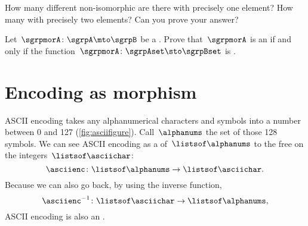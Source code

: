 
\begin{gradedexercise}
    \label{ex:non-isomorphic}
    How many different non-isomorphic  are there with precisely one element?
    How many with precisely two elements?
    Can you prove your answer?
\end{gradedexercise}

\begin{gradedexercise}
    \label{ex:CharacterizeSemigroupIsos}
    \label{ex:semi-morph}
    Let~$\sgrpmorA\colon \sgrpA \mto \sgrpB$ be a .
    Prove that~$\sgrpmorA$ is an  if and only if the function~$\sgrpmorA \colon \sgrpAset \sto \sgrpBset$ is .
\end{gradedexercise}

\section{Encoding as morphism }

\begin{example}
    ASCII encoding takes any alphanumerical characters and symbols into a number between 0 and 127 (\cref{fig:asciifigure}).
    Call~$\alphanums$ the set of those 128 symbols.
    We can see ASCII encoding as a  of~$\listsof\alphanums$ to the free  on the integers~$\listsof\asciichar$:
    \begin{equation}
        \label{eq:ASCII-semi}
        \asciienc\colon \listsof\alphanums \to \listsof\asciichar.
    \end{equation}
    Because we can also go back, by using the inverse function,
    \begin{equation}
        \label{eq:ASCII-semi-inv}
        \asciienc^{-1}\colon \listsof\asciichar \to \listsof\alphanums,
    \end{equation}
    ASCII encoding is also an .
\end{example}

